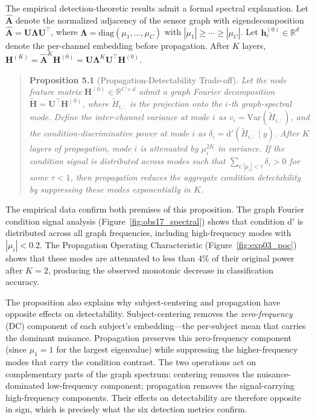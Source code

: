 The empirical detection-theoretic results admit a formal spectral explanation. Let $\hat{\mathbf{A}}$ denote the normalized adjacency of the sensor graph with eigendecomposition $\hat{\mathbf{A}} = \mathbf{U}\boldsymbol{\Lambda}\mathbf{U}^\top$, where $\boldsymbol{\Lambda} = \text{diag}(\mu_1, \ldots, \mu_C)$ with $|\mu_1| \geq \cdots \geq |\mu_C|$. Let $\mathbf{h}_c^{(0)} \in \mathbb{R}^d$ denote the per-channel embedding before propagation. After $K$ layers, $\mathbf{H}^{(K)} = \hat{\mathbf{A}}^K \mathbf{H}^{(0)} = \mathbf{U}\boldsymbol{\Lambda}^K\mathbf{U}^\top \mathbf{H}^{(0)}$.

\begin{quote}
\textbf{Proposition 5.1} (Propagation-Detectability Trade-off). \emph{Let the node feature matrix $\mathbf{H}^{(0)} \in \mathbb{R}^{C \times d}$ admit a graph Fourier decomposition $\tilde{\mathbf{H}} = \mathbf{U}^\top \mathbf{H}^{(0)}$, where $\tilde{H}_{i,:}$ is the projection onto the $i$-th graph-spectral mode. Define the inter-channel variance at mode $i$ as $v_i = \text{Var}(\tilde{H}_{i,:})$, and the condition-discriminative power at mode $i$ as $\delta_i = \text{d}'(\tilde{H}_{i,:} \mid y)$. After $K$ layers of propagation, mode $i$ is attenuated by $\mu_i^{2K}$ in variance. If the condition signal is distributed across modes such that $\sum_{i: |\mu_i| < \tau} \delta_i > 0$ for some $\tau < 1$, then propagation reduces the aggregate condition detectability by suppressing these modes exponentially in $K$.}
\end{quote}

The empirical data confirm both premises of this proposition. The graph Fourier condition signal analysis (Figure~\ref{fig:obs17_spectral}) shows that condition d$'$ is distributed across all graph frequencies, including high-frequency modes with $|\mu_i| < 0.2$. The Propagation Operating Characteristic (Figure~\ref{fig:exp03_poc}) shows that these modes are attenuated to less than $4\%$ of their original power after $K = 2$, producing the observed monotonic decrease in classification accuracy.

The proposition also explains why subject-centering and propagation have opposite effects on detectability. Subject-centering removes the \emph{zero-frequency} (DC) component of each subject's embedding---the per-subject mean that carries the dominant nuisance. Propagation preserves this zero-frequency component (since $\mu_1 = 1$ for the largest eigenvalue) while suppressing the higher-frequency modes that carry the condition contrast. The two operations act on complementary parts of the graph spectrum: centering removes the nuisance-dominated low-frequency component; propagation removes the signal-carrying high-frequency components. Their effects on detectability are therefore opposite in sign, which is precisely what the six detection metrics confirm.

